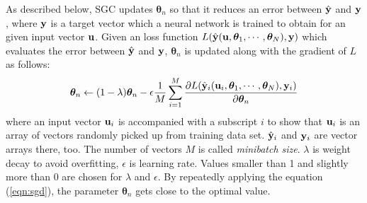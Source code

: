 \documentclass[twocolumn]{article}
\begin{document}
As described below,
SGC updates ${\bm \theta}_n$ so that it reduces an error
between $\hat{\bf y}$ and ${\bf y}$,
where ${\bf y}$ is a target vector
which a neural network is trained to obtain
for an given input vector ${\bf u}$.
Given an loss function
$L(\hat{\bf y}({\bf u},{\bm \theta}_1,\cdots,{\bm \theta}_N),{\bf y})$
which evaluates the error between $\hat{\bf y}$ and ${\bf y}$,
${\bm \theta}_n$ is updated along with the gradient of $L$ as follows:
\begin{eqnarray}
{\bm \theta}_n \leftarrow
(1-\lambda){\bm \theta}_n
- \epsilon
  \frac{1}{M}\sum_{i=1}^M
  \frac{\partial L(\hat{\bf y}_i({\bf u}_i,{\bm \theta}_1,
                               \cdots,{\bm \theta}_N),
                   {\bf y}_i)}
       {\partial {\bm \theta}_n}\label{eqn:sgd}
\end{eqnarray}
where an input vector ${\bf u}_i$ is accompanied with a subscript $i$
to show that ${\bf u}_i$ is an array of vectors randomly picked up
from training data set.
$\hat{\bf y}_i$ and ${\bf y}_i$ are vector arrays there, too.
The number of vectors $M$ is called {\it minibatch size}.
$\lambda$ is weight decay to avoid overfitting,
$\epsilon$ is learning rate.
Values smaller than 1 and slightly more than 0 are chosen
for $\lambda$ and $\epsilon$.
By repeatedly applying the equation (\ref{eqn:sgd}),
the parameter ${\bm \theta}_n$ gets close to the optimal value.
\end{document}
